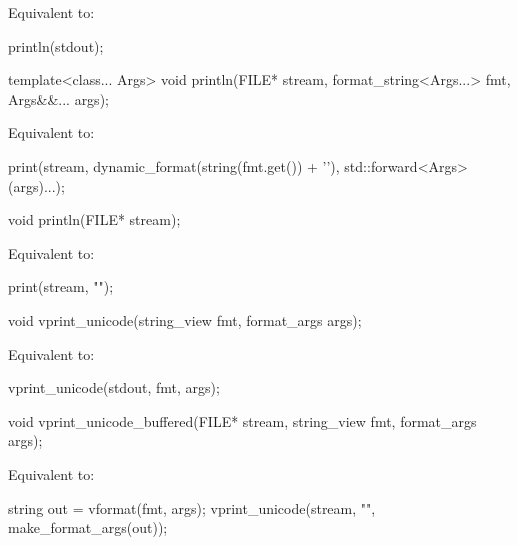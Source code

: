 \begin{itemdescr}
\pnum
\effects
Equivalent to:
\begin{codeblock}
println(stdout);
\end{codeblock}
\end{itemdescr}

%
\begin{itemdecl}
template<class... Args>
  void println(FILE* stream, format_string<Args...> fmt, Args&&... args);
\end{itemdecl}

\begin{itemdescr}
\pnum
\effects
Equivalent to:
\begin{codeblock}
print(stream, dynamic_format(string(fmt.get()) + '\n'), std::forward<Args>(args)...);
\end{codeblock}
\end{itemdescr}

%
\begin{itemdecl}
void println(FILE* stream);
\end{itemdecl}

\begin{itemdescr}
\pnum
\effects
Equivalent to:
\begin{codeblock}
print(stream, "\n");
\end{codeblock}
\end{itemdescr}

%
\begin{itemdecl}
void vprint_unicode(string_view fmt, format_args args);
\end{itemdecl}

\begin{itemdescr}
\pnum
\effects
Equivalent to:
\begin{codeblock}
vprint_unicode(stdout, fmt, args);
\end{codeblock}
\end{itemdescr}

%
\begin{itemdecl}
void vprint_unicode_buffered(FILE* stream, string_view fmt, format_args args);
\end{itemdecl}

\begin{itemdescr}
\pnum
\effects
Equivalent to:
\begin{codeblock}
string out = vformat(fmt, args);
vprint_unicode(stream, "{}", make_format_args(out));
\end{codeblock}
\end{itemdescr}


